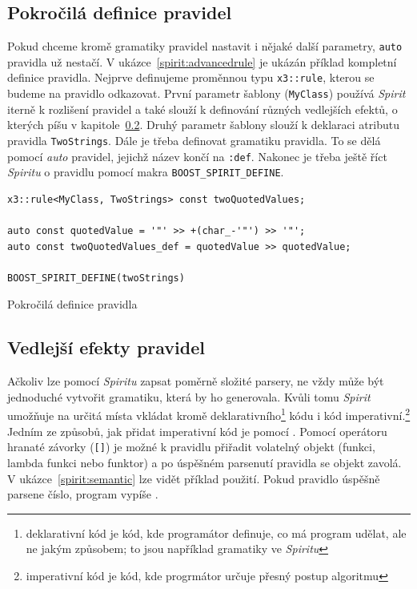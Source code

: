 \documentclass[thesis=B,czech,hidelinks]{FITthesis}[2019/03/06]
\begin{document}
\subsection{Pokročilá definice pravidel}\label{advanced:rules}
Pokud chceme kromě gramatiky pravidel nastavit i nějaké další parametry, \texttt{auto} pravidla už nestačí. V ukázce~\ref{spirit:advancedrule} je ukázán příklad kompletní definice pravidla. Nejprve definujeme proměnnou typu \texttt{x3::rule}, kterou se budeme na pravidlo odkazovat. První parametr šablony (\texttt{MyClass}) používá \textit{Spirit} iterně k rozlišení pravidel a také slouží k definování různých vedlejších efektů, o kterých píšu v kapitole~\ref{sideeffects}. Druhý parametr šablony slouží k deklaraci atributu pravidla \texttt{TwoStrings}. Dále je třeba definovat gramatiku pravidla. To se dělá pomocí \textit{auto} pravidel, jejichž název končí na \verb¨:def¨. Nakonec je třeba ještě říct \textit{Spiritu} o pravidlu pomocí makra \verb¨BOOST_SPIRIT_DEFINE¨.

\begin{listing}
\begin{verbatim}
x3::rule<MyClass, TwoStrings> const twoQuotedValues;

auto const quotedValue = '"' >> +(char_-'"') >> '"';
auto const twoQuotedValues_def = quotedValue >> quotedValue;

BOOST_SPIRIT_DEFINE(twoStrings)
\end{verbatim}
\caption{Pokročilá definice pravidla}\label{spirit:advancedrule}
\end{listing}

\subsection{Vedlejší efekty pravidel}\label{sideeffects}
Ačkoliv lze pomocí \textit{Spiritu} zapsat poměrně složité parsery, ne vždy může být jednoduché vytvořit gramatiku, která by ho generovala. Kvůli tomu \textit{Spirit} umožňuje na určitá místa vkládat kromě deklarativního\footnote{deklarativní kód je kód, kde programátor definuje, co má program udělat, ale ne jakým způsobem; to jsou například gramatiky ve \textit{Spiritu}} kódu i kód imperativní.\footnote{imperativní kód je kód, kde progrmátor určuje přesný postup algoritmu} Jedním ze způsobů, jak přidat imperativní kód je pomocí . Pomocí operátoru hranaté závorky (\verb¨[]¨) je možné k pravidlu přiřadit volatelný objekt (funkci, lambda funkci nebo funktor) a po úspěšném parsenutí pravidla se objekt zavolá. V ukázce~\ref{spirit:semantic} lze vidět příklad použití. Pokud pravidlo úspěšně parsene číslo, program vypíše .
\end{document}
